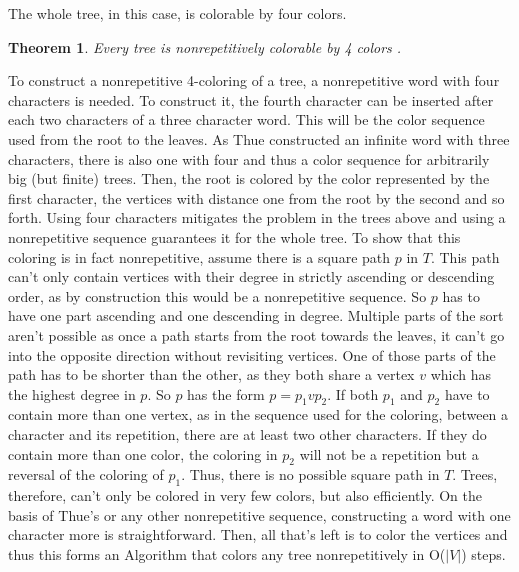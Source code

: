 \documentclass[12pt,a4paper]{article}
\newtheorem{theorem}{Theorem}
\begin{document}
\begin{figure}

\end{figure}
The whole tree, in this case, is colorable by four colors.
\begin{theorem}
Every tree is nonrepetitively colorable by 4 colors \citep{Bresar2007}.
\end{theorem} 
To construct a nonrepetitive 4-coloring of a tree, a nonrepetitive word with four characters is needed. To construct it, the fourth character can be inserted after each two characters of a three character word. This will be the color sequence used from the root to the leaves. As Thue constructed an infinite word with three characters, there is also one with four and thus a color sequence for arbitrarily big (but finite) trees. Then, the root is colored by the color represented by the first character, the vertices with distance one from the root by the second and so forth. Using four characters mitigates the problem in the trees above and using a nonrepetitive sequence guarantees it for the whole tree.
\newline
To show that this coloring is in fact nonrepetitive, assume there is a square path $p$ in $T$. This path can't only contain vertices with their degree in strictly ascending or descending order, as by construction this would be a nonrepetitive sequence. So $p$ has to have one part ascending and one descending in degree. Multiple parts of the sort aren't possible as once a path starts from the root towards the leaves, it can't go into the opposite direction without revisiting vertices. One of those parts of the path has to be shorter than the other, as they both share a vertex $v$ which has the highest degree in $p$. So $p$ has the form $p = p_1vp_2$. If both $p_1$ and $p_2$ have to contain more than one vertex, as in the sequence used for the coloring, between a character and its repetition, there are at least two other characters. If they do contain more than one color, the coloring in $p_2$ will not be a repetition but a reversal of the coloring of $p_1$. Thus, there is no possible square path in $T$. 
\newline
Trees, therefore, can't only be colored in very few colors, but also efficiently. On the basis of Thue's or any other nonrepetitive sequence, constructing a word with one character more is straightforward. Then, all that's left is to color the vertices and thus this forms an Algorithm that colors any tree nonrepetitively in O($|V|$) steps.
\end{document}
